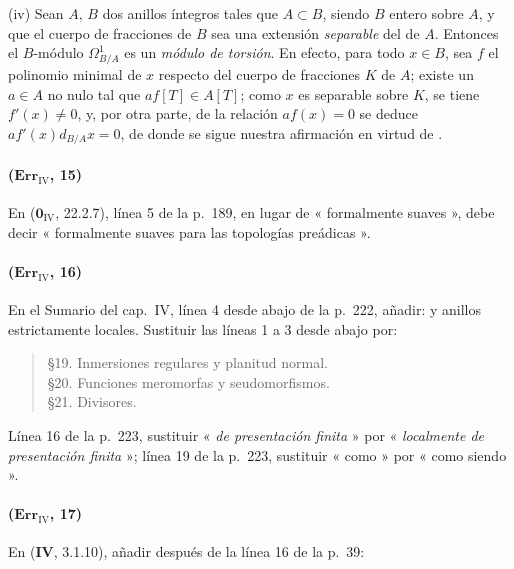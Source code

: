 \medskip
\noindent
(iv) Sean $A$, $B$ dos anillos íntegros tales que $A\subset B$, siendo $B$
entero sobre $A$, y que el cuerpo de fracciones de $B$ sea una
extensión \emph{separable} del de $A$. Entonces el $B$-módulo
$\Omega^1_{B/A}$ es un \emph{módulo de torsión}. En efecto, para todo $x\in B$,
sea $f$ el polinomio minimal de $x$ respecto del cuerpo de fracciones
$K$ de $A$; existe un $a\in A$ no nulo tal que $af[T]\in A[T]$; como
$x$ es separable sobre $K$, se tiene $f'(x)\neq0$, y, por otra parte, de la
relación $af(x)=0$ se deduce $af'(x)d_{B/A}x=0$, de donde se sigue nuestra afirmación
en virtud de {}.

\paragraph{($\mathbf{Err}_{\mathrm{IV}}$, 15)}
En ($\mathbf{0}_{\mathrm{IV}}$, 22.2.7), línea 5 de la p.~189, en lugar de
« formalmente suaves », debe decir « formalmente suaves para las topologías preádicas ».

\paragraph{($\mathbf{Err}_{\mathrm{IV}}$, 16)}
En el Sumario del cap.~IV, línea 4 desde abajo de la p.~222, añadir:
y anillos estrictamente locales. Sustituir las líneas 1 a 3 desde abajo por:
\begin{quote}
\S19. Inmersiones regulares y planitud normal.\\
\S20. Funciones meromorfas y seudomorfismos.\\
\S21. Divisores.
\end{quote}
Línea 16 de la p.~223, sustituir « \emph{de presentación finita} » por
« \emph{localmente de presentación finita} »; línea 19 de la p.~223, sustituir
« como » por « como siendo ».

\paragraph{($\mathbf{Err}_{\mathrm{IV}}$, 17)}
En (\textbf{IV}, 3.1.10), añadir después de la línea 16 de la p.~39:

